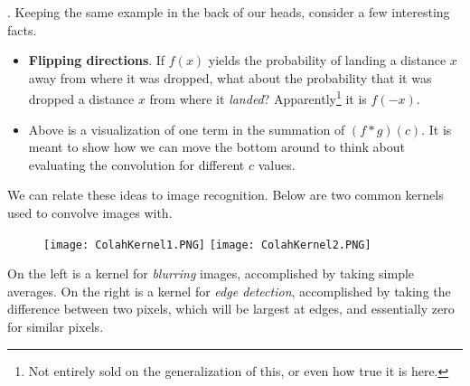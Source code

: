 \myspace
\p {}. Keeping the same example in the back of our heads, consider a few interesting facts. 
\begin{itemize}
	\item \textbf{Flipping directions}. If $f(x)$ yields the probability of landing a distance $x$ away from where it was dropped, what about the probability that it was dropped a distance $x$ from where it \textit{landed}? Apparently\footnote{Not entirely sold on the generalization of this, or even how true it is here.} it is $f(-x)$. 
	
	
	\item Above is a visualization of one term in the summation of $(f * g)(c)$. It is meant to show how we can move the bottom around to think about evaluating the convolution for different $c$ values. 
\end{itemize}
We can relate these ideas to image recognition. Below are two common kernels used to convolve images with. 
\begin{figure}[h!]
	\centering
	\texttt{[image: ColahKernel1.PNG]}
	\hspace{2.5cm}
	\texttt{[image: ColahKernel2.PNG]}
\end{figure}

On the left is a kernel for \textit{blurring} images, accomplished by taking simple averages. On the right is a kernel for \textit{edge detection}, accomplished by taking the difference between two pixels, which will be largest at edges, and essentially zero for similar pixels.































